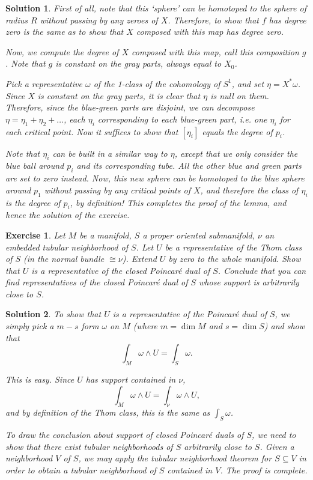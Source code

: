 \documentclass{article}
\newtheorem{ex}{Exercise}
\theoremstyle{nonumberplain}
\newtheorem{sol}{Solution}
\begin{document}
\begin{sol}
First of all, note that this `sphere' can be homotoped to the sphere of radius $R$ without passing by any zeroes of $X$. Therefore, to show that $f$ has degree zero is the same as to show that $X$ composed with this map has degree zero.

Now, we compute the degree of $X$ composed with this map, call this composition $g$. Note that $g$ is constant on the gray parts, always equal to $X_0$.

Pick a representative $\omega$ of the 1-class of the cohomology of $S^1$, and set $\eta = X^* \omega$. Since $X$ is constant on the gray parts, it is clear that $\eta$ is null on them. Therefore, since the blue-green parts are disjoint, we can decompose $\eta = \eta_1 + \eta_2 + \dots$, each $\eta_i$ corresponding to each blue-green part, i.e. one $\eta_i$ for each critical point. Now it suffices to show that $[\eta_i]$ equals the degree of $p_i$.

Note that $\eta_i$ can be built in a similar way to $\eta$, except that we only consider the blue ball around $p_i$ and its corresponding tube. All the other blue and green parts are set to zero instead. Now, this new sphere can be homotoped to the blue sphere around $p_1$ without passing by any critical points of $X$, and therefore the class of $\eta_i$ is the degree of $p_i$, \emph{by definition}! This completes the proof of the lemma, and hence the solution of the exercise.
\end{sol}

\begin{ex}
Let $M$ be a manifold, $S$ a proper oriented submanifold, $\nu$ an embedded tubular neighborhood of $S$. Let $U$ be a representative of the Thom class of $S$ (in the normal bundle $\cong \nu$). Extend $U$ by zero to the whole manifold. Show that $U$ is a representative of the closed Poincaré dual of $S$. Conclude that you can find representatives of the closed Poincaré dual of $S$ whose support is arbitrarily close to $S$.
\end{ex}

\begin{sol}
To show that $U$ is a representative of the Poincaré dual of $S$, we simply pick a $m-s$ form $\omega$ on $M$ (where $m = \dim M$ and $s = \dim S$) and show that
\[\int_M \omega \wedge U = \int_S \omega.\]

This is easy. Since $U$ has support contained in $\nu$,
\[\int_M \omega \wedge U = \int_\nu \omega \wedge U,\]
and by definition of the Thom class, this is the same as $\int_S \omega$.

To draw the conclusion about support of closed Poincaré duals of $S$, we need to show that there exist tubular neighborhoods of $S$ arbitrarily close to $S$. Given a neighborhood $V$ of $S$, we may apply the tubular neighborhood theorem for $S \subseteq V$ in order to obtain a tubular neighborhood of $S$ contained in $V$. The proof is complete.
\end{sol}
\end{document}
